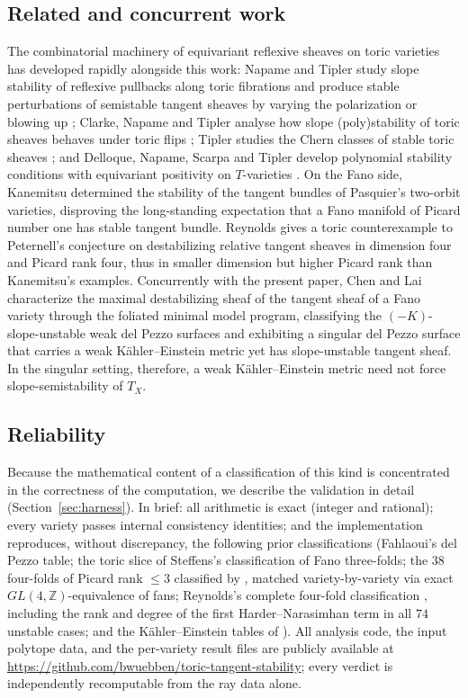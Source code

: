 \documentclass[11pt]{amsart}
\theoremstyle{definition}
\theoremstyle{remark}
\newcommand{\ZZ}{\mathbb{Z}}
\begin{document}
\subsection*{Related and concurrent work}
The combinatorial machinery of equivariant reflexive sheaves on toric
varieties has developed rapidly alongside this work: Napame and Tipler
study slope stability of reflexive pullbacks along toric fibrations and
produce stable perturbations of semistable tangent sheaves by varying
the polarization or blowing up \cite{NapameTipler2024}; Clarke, Napame
and
Tipler analyse how slope (poly)stability of toric sheaves behaves under
toric flips \cite{ClarkeNapameTipler}; Tipler studies the Chern classes
of stable toric sheaves \cite{Tipler2025}; and Delloque, Napame, Scarpa
and Tipler develop polynomial stability conditions with equivariant
positivity on $T$-varieties \cite{DNST2025}. On the Fano side, Kanemitsu
\cite{Kanemitsu2021} determined the stability of the tangent bundles of
Pasquier's two-orbit varieties, disproving the long-standing expectation
that a Fano manifold of Picard number one has stable tangent bundle.
Reynolds \cite[Theorem~2.2.6]{Reynolds2023} gives a toric counterexample
to Peternell's conjecture on destabilizing relative tangent sheaves
\cite[Conjecture~3.21]{Peternell2001} in dimension four and Picard rank
four, thus in smaller dimension but higher Picard rank than Kanemitsu's
examples. Concurrently with the present paper, Chen and Lai \cite{ChenLai2026}
characterize the maximal destabilizing sheaf of the tangent sheaf of a
Fano variety through the foliated minimal model program, classifying the
$(-K)$-slope-unstable weak del Pezzo surfaces and exhibiting a singular
del Pezzo surface that carries a weak K\"ahler--Einstein metric yet has
slope-unstable tangent sheaf. In the singular setting, therefore, a weak
K\"ahler--Einstein metric need not force slope-semistability of $T_X$.

\subsection*{Reliability}
Because the mathematical content of a classification of this kind is
concentrated in the correctness of the computation, we describe the
validation in detail (Section~\ref{sec:harness}). In brief: all
arithmetic is exact (integer and rational); every variety passes internal
consistency identities; and the implementation reproduces, without
discrepancy, the following prior classifications (Fahlaoui's del Pezzo
table; the
toric slice of Steffens's classification of Fano three-folds; the
$38$ four-folds of Picard rank $\le 3$ classified by
\cite{BDGP2021,DDK}, matched variety-by-variety via exact
$GL(4,\ZZ)$-equivalence of fans; Reynolds's complete four-fold
classification \cite[Appendix~A]{Reynolds2023}, including the rank and
degree of the first Harder--Narasimhan term in all $74$ unstable cases;
and the K\"ahler--Einstein tables of
\cite{Nakagawa1993,Nakagawa1994,NSY2023}). All analysis code, the input polytope
data, and the per-variety result files are publicly available at
\url{https://github.com/bwuebben/toric-tangent-stability}; every verdict
is independently recomputable from the ray data alone.
\end{document}

